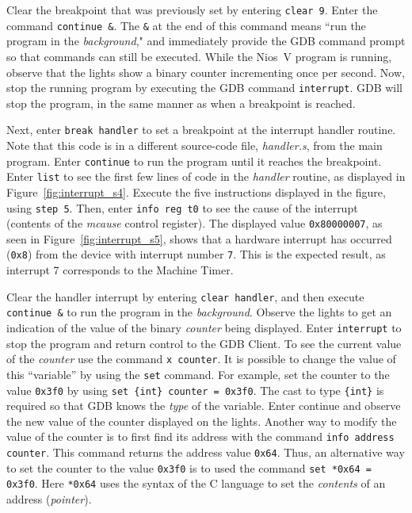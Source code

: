 \documentclass[11pt, twoside, pdftex]{article}
\newcommand{\red}[1]{{\color{red}\sf{#1}}}
\begin{document}
Clear the breakpoint that was previously set by entering \texttt{clear 9}. 
Enter the command \texttt{continue \&}. The \texttt{\&} at the end of this command means
``run the program in the {\it background}," and immediately provide the GDB command prompt so
that commands can still be executed. While the Nios~V program is running, observe that the 
\red{\it LEDR} lights show a binary counter incrementing once per second.  Now, stop the 
running program by executing the GDB command \texttt{interrupt}. GDB will stop the
program, in the same manner as when a breakpoint is reached.

Next, enter \texttt{break handler} to set a breakpoint at the interrupt handler routine.
Note that this code is in a different source-code file, {\it handler.s}, from the main program.
Enter \texttt{continue} to run the program until it reaches the breakpoint. Enter
\texttt{list} to see the first few lines of code in the {\it handler} routine, as displayed in
Figure~\ref{fig:interrupt_s4}. Execute the five instructions displayed in the figure, using
\texttt{step 5}. Then, enter \texttt{info reg t0} to see the cause of the interrupt
(contents of the {\it mcause} control register). The displayed value \texttt{0x80000007}, as 
seen in Figure~\ref{fig:interrupt_s5}, shows that a hardware interrupt has occurred (\texttt{0x8})
from the device with interrupt number \texttt{7}. This is the expected result, as
interrupt 7 corresponds to the Machine Timer. 

Clear the handler interrupt by entering \texttt{clear handler}, and then execute
\texttt{continue \&} to run the program in the {\it background}. 
Observe the \red{\it LEDR} lights to get an indication of the
value of the binary {\it counter} being displayed. Enter \texttt{interrupt} to stop the
program and return control to the GDB Client. To see the current value of the {\it counter}
use the command \texttt{x counter}. It is possible to change the value of this ``variable'' 
by using the \texttt{set} command. For example, set the counter to the value \texttt{0x3f0} by
using \texttt{set \{int\} counter = 0x3f0}. The cast to type \texttt{\{int\}} is required so that 
GDB knows the {\it type} of the variable. Enter continue and observe the new value of
the counter displayed on the \red{\it LEDR} lights. Another way to modify the value of
the counter is to first find its address with the command \texttt{info address counter}.
This command returns the address value \texttt{0x64}. Thus, an alternative way to set the 
counter to the value \texttt{0x3f0} is to used the command
\texttt{set *0x64 = 0x3f0}. Here \texttt{*0x64}
uses the syntax of the C language to set the {\it contents} of an address ({\it pointer}). 
\end{document}
